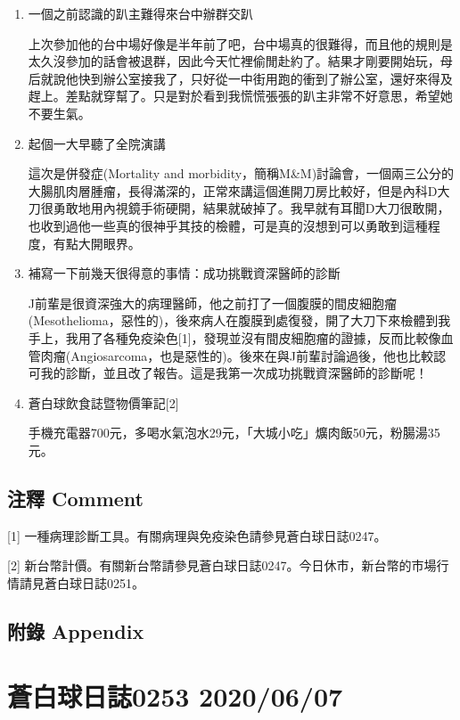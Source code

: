 \documentclass[a5paper, 11pt
]{book}
\begin{document}
\begin{enumerate}
\def\labelenumi{\arabic{enumi}.}
\item
  一個之前認識的趴主難得來台中辦群交趴

  上次參加他的台中場好像是半年前了吧，台中場真的很難得，而且他的規則是太久沒參加的話會被退群，因此今天忙裡偷閒赴約了。結果才剛要開始玩，母后就說他快到辦公室接我了，只好從一中街用跑的衝到了辦公室，還好來得及趕上。差點就穿幫了。只是對於看到我慌慌張張的趴主非常不好意思，希望她不要生氣。
\item
  起個一大早聽了全院演講

  這次是併發症(Mortality and
  morbidity，簡稱M\&M)討論會，一個兩三公分的大腸肌肉層腫瘤，長得滿深的，正常來講這個進開刀房比較好，但是內科D大刀很勇敢地用內視鏡手術硬開，結果就破掉了。我早就有耳聞D大刀很敢開，也收到過他一些真的很神乎其技的檢體，可是真的沒想到可以勇敢到這種程度，有點大開眼界。
\item
  補寫一下前幾天很得意的事情：成功挑戰資深醫師的診斷

  J前輩是很資深強大的病理醫師，他之前打了一個腹膜的間皮細胞瘤(Mesothelioma，惡性的)，後來病人在腹膜到處復發，開了大刀下來檢體到我手上，我用了各種免疫染色{[}1{]}，發現並沒有間皮細胞瘤的證據，反而比較像血管肉瘤(Angiosarcoma，也是惡性的)。後來在與J前輩討論過後，他也比較認可我的診斷，並且改了報告。這是我第一次成功挑戰資深醫師的診斷呢！
\item
  蒼白球飲食誌暨物價筆記{[}2{]}

  手機充電器700元，多喝水氣泡水29元，「大城小吃」爌肉飯50元，粉腸湯35元。
\end{enumerate}

\hypertarget{ux6ce8ux91cb-comment-5}{%
\subsection{注釋 Comment}\label{ux6ce8ux91cb-comment-5}}

{[}1{]} 一種病理診斷工具。有關病理與免疫染色請參見蒼白球日誌0247。

{[}2{]}
新台幣計價。有關新台幣請參見蒼白球日誌0247。今日休市，新台幣的市場行情請見蒼白球日誌0251。

\hypertarget{ux9644ux9304-appendix-5}{%
\subsection{附錄 Appendix}\label{ux9644ux9304-appendix-5}}

\hypertarget{ux84bcux767dux7403ux65e5ux8a8c0253-20200607}{%
\section{蒼白球日誌0253
2020/06/07}\label{ux84bcux767dux7403ux65e5ux8a8c0253-20200607}}
\end{document}
